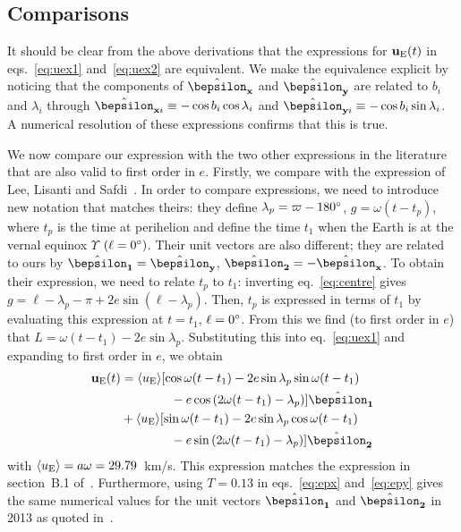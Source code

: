 \documentclass[preprintnumbers,a4paper,twocolumn,floats,nofootinbib,superscriptaddress,aps,prd]{revtex4-1}
\newcommand{\epx}{\hat{\bepsilon}_{\mathbf{x}}}
\newcommand{\epy}{\hat{\bepsilon}_{\mathbf{y}}}
\newcommand{\epone}{\hat{\bepsilon}_{\mathbf{1}}}
\newcommand{\eptwo}{\hat{\bepsilon}_{\mathbf{2}}}
\begin{document}
\subsection{Comparisons}
\label{subsection:comparison}

It should be clear from the above derivations that the expressions for $\mathbf{u}_{\rm{E}}(t)$ in eqs.~\eqref{eq:uex1} and~\eqref{eq:uex2} are equivalent. We make the equivalence explicit by noticing that the components of $\epx$ and $\epy$ are related to $b_i$ and $\lambda_i$ through $\hat{\bepsilon}_{\mathbf{x}i} \equiv-\cos b_i \cos \lambda_i$ and $\hat{\bepsilon}_{\mathbf{y}i} \equiv-\cos b_i \sin \lambda_i$. A numerical resolution of these expressions confirms that this is true.

We now compare our expression with the two other expressions in the literature that are also valid to first order in $e$. Firstly, we compare with the expression of Lee, Lisanti and Safdi~\cite{Lee:2013xxa}. In order to compare expressions, we need to introduce new notation that matches theirs: they define $\lambda_p=\varpi-180\degree$, $g=\omega(t-t_p)$, where $t_p$ is the time at perihelion and define the time $t_1$ when the Earth is at the vernal equinox $\Upsilon$ $(\ell=0\degree)$. Their unit vectors are also different; they are related to ours by $\epone=\epy$, $\eptwo=-\epx$. To obtain their expression, we need to relate $t_p$ to $t_1$: inverting eq.~\eqref{eq:centre} gives $g=\ell-\lambda_p-\pi+2e\sin(\ell-\lambda_p)$. Then, $t_p$ is expressed in terms of $t_1$ by evaluating this expression at $t=t_1$, $\ell=0\degree$. From this we find (to first order in $e$) that $L=\omega (t-t_1)-2e\sin\lambda_p$. Substituting this into eq.~\eqref{eq:uex1} and expanding to first  order in $e$, we obtain
\begin{equation}
\begin{split}
\mathbf{u}_{\mathrm{E}}(t)&=\langle u_{\rm{E}}\rangle [\cos\omega(t-t_1)-2 e \sin \lambda_p \sin\omega(t-t_1) \\
&\qquad\qquad-e\cos\left(2 \omega (t-t_1)-\lambda_p\right)] \epone\\
&+\langle u_{\rm{E}}\rangle [\sin\omega(t-t_1)-2 e \sin \lambda_p \cos\omega(t-t_1)\\
&\qquad\qquad-e\sin\left(2 \omega (t-t_1)-\lambda_p\right)]\eptwo
\end{split}
\end{equation}
with $\langle u_{\rm{E}}\rangle=a \omega=29.79$~km/s. This expression matches the expression in section~B.1 of~\cite{Lee:2013xxa}. Furthermore, using $T=0.13$ in eqs.~\eqref{eq:epx} and~\eqref{eq:epy} gives the same numerical values for the unit vectors $\epone$ and $\eptwo$ in 2013 as quoted in~\cite{Lee:2013xxa}.
\end{document}
